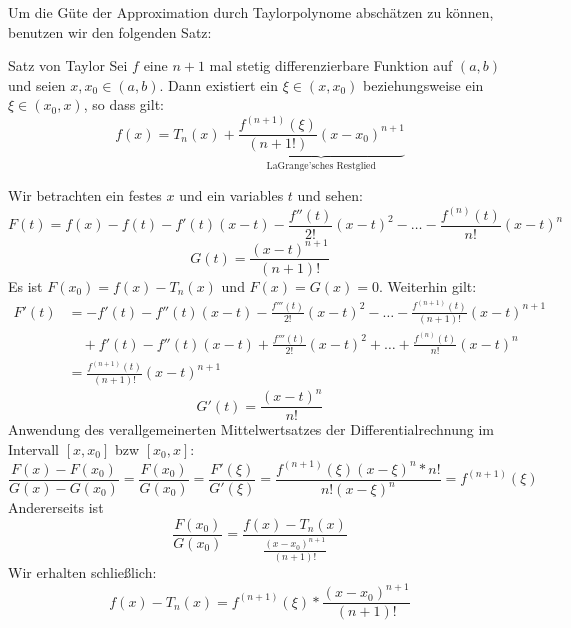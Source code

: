 Um die Güte der Approximation durch Taylorpolynome abschätzen zu können, benutzen wir den folgenden Satz:
\begin{satz}{Satz von Taylor}
Sei $f$ eine $n+1$ mal stetig differenzierbare Funktion auf $(a,b)$ und seien $x,x_0\in(a,b)$. Dann existiert ein $\xi\in(x,x_0)$ beziehungsweise ein $\xi\in(x_0,x)$, so dass gilt:
\begin{equation*}
	f(x)=T_n(x)+\underbrace{\frac{f^{(n+1)}(\xi)}{(n+1!)}(x-x_0)^{n+1}}_{\text{LaGrange'sches Restglied}}
\end{equation*}
\end{satz}
\beweis
Wir betrachten ein festes $x$ und ein variables $t$ und sehen:
\begin{equation*}
	F(t)=f(x)-f(t)-f'(t)(x-t)-\frac{f''(t)}{2!}(x-t)^2-\ldots-\frac{f^{(n)}(t)}{n!}(x-t)^n
\end{equation*}
\begin{equation*}
	G(t)=\frac{(x-t)^{n+1}}{(n+1)!}
\end{equation*}
Es ist $F(x_0)=f(x)-T_n(x)$ und $F(x)=G(x)=0$. Weiterhin gilt:
\begin{align*}
	F'(t)&=-f'(t)-f''(t)(x-t)-\frac{f'''(t)}{2!}(x-t)^2-\ldots-\frac{f^{(n+1)}(t)}{(n+1)!}(x-t)^{n+1}\\
		&\quad +f'(t)-f''(t)(x-t)+\frac{f'''(t)}{2!}(x-t)^2+\ldots+\frac{f^{(n)}(t)}{n!}(x-t)^{n}\\
		&=\frac{f^{(n+1)}(t)}{(n+1)!}(x-t)^{n+1}
\end{align*}
\begin{equation*}
	G'(t)=\frac{(x-t)^n}{n!}
\end{equation*}
Anwendung des verallgemeinerten Mittelwertsatzes der Differentialrechnung im Intervall $[x,x_0]$ bzw $[x_0,x]$:
\begin{equation*}
\frac{F(x)-F(x_0)}{G(x)-G(x_0)}=\frac{F(x_0)}{G(x_0)}=\frac{F'(\xi)}{G'(\xi)}=\frac{f^{(n+1)}(\xi)(x-\xi)^n*n!}{n!(x-\xi)^n}=f^{(n+1)}(\xi)
\end{equation*}
Andererseits ist
\begin{equation*}
	\frac{F(x_0)}{G(x_0)}=\frac{f(x)-T_n(x)}{\frac{(x-x_0)^{n+1}}{(n+1)!}}
\end{equation*}
Wir erhalten schließlich:
\begin{equation*}
	f(x)-T_n(x)=f^{(n+1)}(\xi)*\frac{(x-x_0)^{n+1}}{(n+1)!}
\end{equation*}


